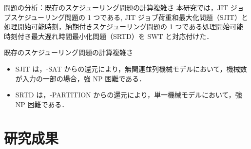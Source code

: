 \documentclass[dvipdfmx]{beamer}
\begin{document}
    \begin{frame}{問題の分析：既存のスケジューリング問題の計算複雑さ}
      本研究では，JIT ジョブスケジューリング問題の 1 つである,
      \alert{JIT ジョブ荷重和最大化問題（SJIT）}と 処理開始可能時刻，納期付きスケジューリング問題の 1 つである\alert{処理開始可能時刻付き最大遅れ時間最小化問題（SRTD）}を SWT と対応付けた．
      \begin{block}{既存のスケジューリング問題の計算複雑さ}
        \begin{itemize}
          \item SJIT は，{-SAT} からの還元により，無関連並列機械モデルにおいて，機械数が入力の一部の場合，\alert{強 NP 困難}である．
          \item SRTD は，{-PARTITION} からの還元により，単一機械モデルにおいて，\alert{強 NP  困難}である．
        \end{itemize}
      \end{block}
    \end{frame}
    \section{研究成果}
\end{document}
